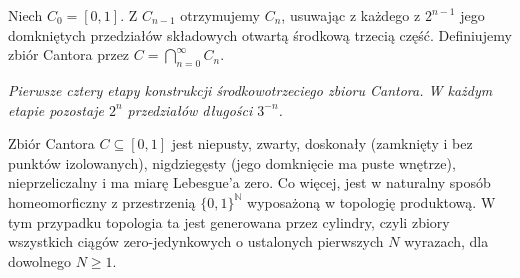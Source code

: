 \begin{definicja}
\label{def:cantor-set}
Niech $C_0=[0,1]$. Z $C_{n-1}$ otrzymujemy $C_n$,
usuwając z każdego z $2^{n-1}$ jego domkniętych
przedziałów składowych otwartą środkową trzecią część.
Definiujemy zbiór Cantora przez
$C=\bigcap_{n=0}^\infty C_n$.
\end{definicja}

\begin{center}

\smallskip
\emph{Pierwsze cztery etapy konstrukcji środkowotrzeciego zbioru Cantora.
W każdym etapie pozostaje $2^n$ przedziałów długości $3^{-n}$.}
\end{center}

\begin{twierdzenie}
\label{thm:cantor-properties}
Zbiór Cantora $C\subseteq[0,1]$ jest niepusty, zwarty,
doskonały (zamknięty i bez punktów izolowanych),
nigdziegęsty (jego domknięcie ma puste wnętrze),
nieprzeliczalny i ma miarę Lebesgue'a zero.
Co więcej, jest w naturalny sposób homeomorficzny
z przestrzenią $\{0,1\}^{\mathbb N}$ wyposażoną
w topologię produktową. W tym przypadku topologia ta
jest generowana przez cylindry, czyli zbiory wszystkich
ciągów zero-jedynkowych o ustalonych pierwszych
$N$ wyrazach, dla dowolnego $N\ge1$.
\end{twierdzenie}

